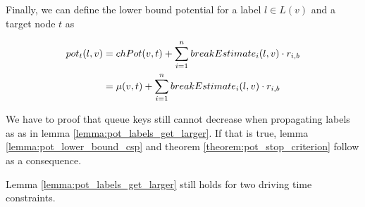 Finally, we can define the lower bound potential for a label $l \in L(v)$ and a target node $t$ as

\begin{align}\label{eq:multiple_breaks_pot}
	\begin{split}
		pot_t(l,v) & =chPot(v,t) + \sum_{i=1}^n{ breakEstimate_i(l,v) \cdot r_{i,b}}\\
		& = \mu(v,t) + \sum_{i=1}^n{ breakEstimate_i(l,v) \cdot r_{i,b}}
	\end{split}
\end{align}

We have to proof that queue keys still cannot decrease when propagating labels as as in lemma \ref{lemma:pot_labels_get_larger}. If that is true, lemma \ref{lemma:pot_lower_bound_csp} and theorem \ref{theorem:pot_stop_criterion} follow as a consequence.

\begin{lemma}
	Lemma \ref{lemma:pot_labels_get_larger} still holds for two driving time constraints.
\end{lemma}

